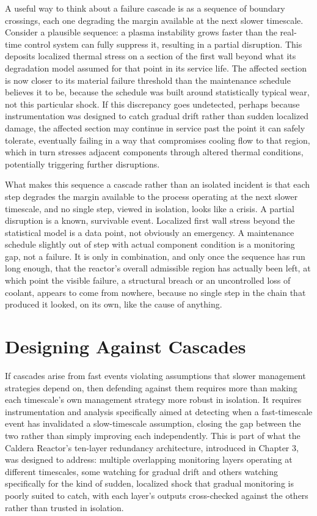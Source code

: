 A useful way to think about a failure cascade is as a sequence of boundary crossings, each one degrading the margin available at the next slower timescale. Consider a plausible sequence: a plasma instability grows faster than the real-time control system can fully suppress it, resulting in a partial disruption. This deposits localized thermal stress on a section of the first wall beyond what its degradation model assumed for that point in its service life. The affected section is now closer to its material failure threshold than the maintenance schedule believes it to be, because the schedule was built around statistically typical wear, not this particular shock. If this discrepancy goes undetected, perhaps because instrumentation was designed to catch gradual drift rather than sudden localized damage, the affected section may continue in service past the point it can safely tolerate, eventually failing in a way that compromises cooling flow to that region, which in turn stresses adjacent components through altered thermal conditions, potentially triggering further disruptions.

What makes this sequence a cascade rather than an isolated incident is that each step degrades the margin available to the process operating at the next slower timescale, and no single step, viewed in isolation, looks like a crisis. A partial disruption is a known, survivable event. Localized first wall stress beyond the statistical model is a data point, not obviously an emergency. A maintenance schedule slightly out of step with actual component condition is a monitoring gap, not a failure. It is only in combination, and only once the sequence has run long enough, that the reactor's overall admissible region has actually been left, at which point the visible failure, a structural breach or an uncontrolled loss of coolant, appears to come from nowhere, because no single step in the chain that produced it looked, on its own, like the cause of anything.

\section{Designing Against Cascades}

If cascades arise from fast events violating assumptions that slower management strategies depend on, then defending against them requires more than making each timescale's own management strategy more robust in isolation. It requires instrumentation and analysis specifically aimed at detecting when a fast-timescale event has invalidated a slow-timescale assumption, closing the gap between the two rather than simply improving each independently. This is part of what the Caldera Reactor's ten-layer redundancy architecture, introduced in Chapter 3, was designed to address: multiple overlapping monitoring layers operating at different timescales, some watching for gradual drift and others watching specifically for the kind of sudden, localized shock that gradual monitoring is poorly suited to catch, with each layer's outputs cross-checked against the others rather than trusted in isolation.

